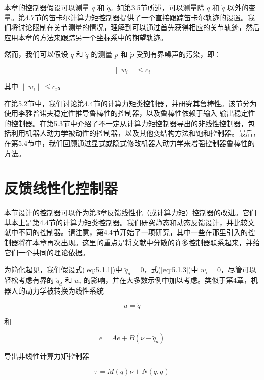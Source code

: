 \documentclass[UTF8,12pt,a4paper]{ctexart}
\begin{document}
本章的控制器假设可以测量 $q$ 和 $\dot{q}$。如第3.5节所述，可以测量除 $q$ 和 $\dot{q}$ 以外的变量。第4.7节的笛卡尔计算力矩控制器提供了一个直接跟踪笛卡尔轨迹的设置。我们将讨论限制在关节测量的情况，理解到可以通过首先获得相应的关节轨迹，然后应用本章的方法来跟踪另一个坐标系中的期望轨迹。

然而，我们可以假设 $q$ 和 $\dot{q}$ 的测量 $p$ 和 $\dot{p}$ 受到有界噪声的污染，即：

\begin{equation}\label{eq:5.1.3}
\|w_i\| \leq c_i
\end{equation}

其中 $\|w_i\| \leq c_i$。

在第5.2节中，我们讨论第4.4节的计算力矩类控制器，并研究其鲁棒性。该节分为使用李雅普诺夫稳定性推导鲁棒性的控制器，以及鲁棒性依赖于输入-输出稳定性的控制器。在第5.3节中介绍了不一定从计算力矩控制器导出的非线性控制器，包括利用机器人动力学被动性的控制器，以及其他变结构方法和饱和控制器。最后，在第5.4节中，我们回顾通过显式或隐式修改机器人动力学来增强控制器鲁棒性的方法。

\section{反馈线性化控制器}

本节设计的控制器可以作为第3章反馈线性化（或计算力矩）控制器的改进。它们基本上是第4.4节的计算力矩类控制器。我们研究静态和动态反馈设计，并比较文献中不同的控制器。请注意，第4.4节开始了一项研究，其中一些在那里引入的控制器将在本章再次出现。这里的重点是将文献中分散的许多控制器联系起来，并给它们一个共同的理论依据。

为简化起见，我们假设式(\ref{eq:5.1.1})中 $\ddot{q}_d = 0$，式(\ref{eq:5.1.3})中 $w_i = 0$，尽管可以轻松考虑有界的 $\ddot{q}_d$ 和 $w_i$ 的影响，并在大多数示例中加以考虑。类似于第4章，机器人的动力学被转换为线性系统

\begin{equation}
u = \ddot{q}
\end{equation}

和

\begin{equation}\label{eq:5.2.1}
\dot{e} = Ae + B(\nu - \ddot{q}_d)
\end{equation}

导出非线性计算力矩控制器

\begin{equation}\label{eq:5.2.2}
\tau = M(q)\nu + N(q, \dot{q})
\end{equation}
\end{document}
